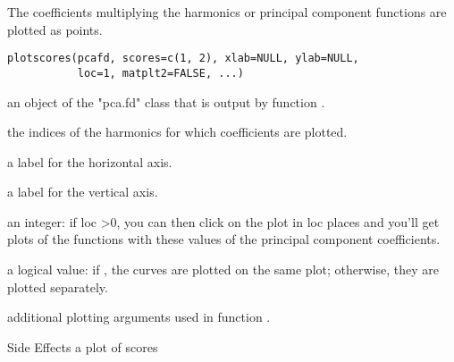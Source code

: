 \documentclass{article}
\begin{document}
\begin{Description}\relax
The coefficients multiplying the harmonics or principal component functions
are plotted as points.
\end{Description}
\begin{Usage}
\begin{verbatim}
plotscores(pcafd, scores=c(1, 2), xlab=NULL, ylab=NULL,
           loc=1, matplt2=FALSE, ...)
\end{verbatim}
\end{Usage}
\begin{Arguments}
\begin{ldescription}
\item[\code{pcafd}] an object of the "pca.fd" class that is output by function
.

\item[\code{scores}] the indices of the harmonics for which coefficients are
plotted.

\item[\code{xlab}] a label for the horizontal axis.

\item[\code{ylab}] a label for the vertical axis.

\item[\code{loc}] an integer:
if loc  >0, you can then click on the plot in loc places and you'll get
plots of the functions with these values of the principal component
coefficients.

\item[\code{matplt2}] a logical value:
if , the curves are plotted on the same plot;
otherwise, they are plotted separately.

\item[\code{... }] additional plotting arguments used in function .

\end{ldescription}
\end{Arguments}
\begin{Section}{Side Effects}
a plot of scores
\end{Section}
\begin{SeeAlso}\relax
{}
\end{SeeAlso}
\end{document}
